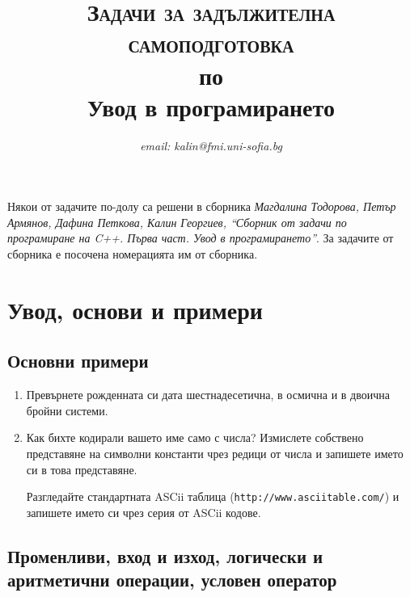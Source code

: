 \documentclass[12pt,a4paper]{article}
\author{\textit{email: kalin@fmi.uni-sofia.bg}}
\title{\textsc{Задачи за задължителна самоподготовка} \\
по \\
Увод в програмирането}
\begin{document}
\maketitle


\small{Някои от задачите по-долу са решени в сборника \cite{sbornik}\textit{Магдалина Тодорова, Петър Армянов, Дафина Петкова, Калин Георгиев, ``Сборник от задачи по програмиране на C++. Първа част. Увод в програмирането''}. За задачите от сборника е посочена номерацията им от сборника.}

\vspace{20px}


\section {Увод, основи и примери}

\subsection {Основни примери}

\begin{enumerate}

	\item Превърнете рожденната си дата шестнадесетична, в осмична и в двоична бройни системи.

	\item Как бихте кодирали вашето име само с числа? Измислете собствено представяне на символни константи чрез редици от числа и запишете името си в това представяне.

	Разгледайте стандартната ASCii таблица (\texttt{http://www.asciitable.com/}) и запишете името си чрез серия от ASCii кодове.

\end{enumerate}

\subsection {Променливи, вход и изход, логически и аритметични операции, условен оператор}
\end{document}
